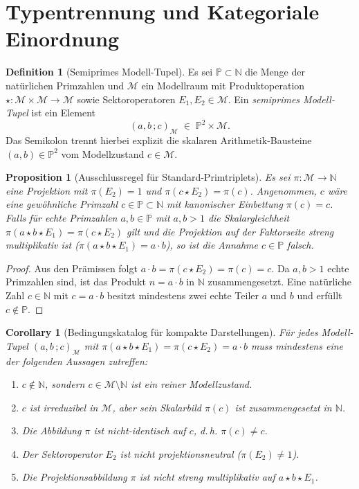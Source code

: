 \documentclass[11pt,a4paper,reqno]{amsart}
\newtheorem{proposition}[theorem]{Proposition}
\newtheorem{corollary}[theorem]{Corollary}
\theoremstyle{definition}
\newtheorem{definition}[theorem]{Definition}
\theoremstyle{remark}
\newcommand{\M}{\mathcal{M}}
\newcommand{\N}{\mathbb{N}}
\newcommand{\Pset}{\mathbb{P}}
\begin{document}
\section{Typentrennung und Kategoriale Einordnung}

\begin{definition}[Semiprimes Modell-Tupel]
Es sei $\Pset \subset \N$ die Menge der natürlichen Primzahlen und $\M$ ein Modellraum mit Produktoperation $\star: \M \times \M \to \M$ sowie Sektoroperatoren $E_1, E_2 \in \M$.
Ein \emph{semiprimes Modell-Tupel} ist ein Element
\begin{equation}
(a,b \,; c)_\M \;\in\; \Pset^2 \times \M.
\end{equation}
Das Semikolon trennt hierbei explizit die skalaren Arithmetik-Bausteine $(a,b) \in \Pset^2$ vom Modellzustand $c \in \M$.
\end{definition}

\begin{proposition}[Ausschlussregel für Standard-Primtriplets]
Es sei $\pi: \M \to \N$ eine Projektion mit $\pi(E_2) = 1$ und $\pi(c \star E_2) = \pi(c)$. Angenommen, $c$ wäre eine gewöhnliche Primzahl $c \in \Pset \subset \N$ mit kanonischer Einbettung $\pi(c) = c$.
Falls für echte Primzahlen $a,b \in \Pset$ mit $a,b > 1$ die Skalargleichheit $\pi(a \star b \star E_1) = \pi(c \star E_2)$ gilt und die Projektion auf der Faktorseite streng multiplikativ ist ($\pi(a \star b \star E_1) = a \cdot b$), so ist die Annahme $c \in \Pset$ falsch.
\end{proposition}

\begin{proof}
Aus den Prämissen folgt $a \cdot b = \pi(c \star E_2) = \pi(c) = c$. Da $a,b > 1$ echte Primzahlen sind, ist das Produkt $n = a \cdot b$ in $\N$ zusammengesetzt. Eine natürliche Zahl $c \in \N$ mit $c = a \cdot b$ besitzt mindestens zwei echte Teiler $a$ und $b$ und erfüllt $c \notin \Pset$.
\end{proof}

\begin{corollary}[Bedingungskatalog für kompakte Darstellungen]
\label{cor:ausschluss}
Für jedes Modell-Tupel $(a,b \,; c)_\M$ mit $\pi(a \star b \star E_1) = \pi(c \star E_2) = a \cdot b$ muss mindestens eine der folgenden Aussagen zutreffen:
\begin{enumerate}
    \item $c \notin \N$, sondern $c \in \M \setminus \N$ ist ein reiner Modellzustand.
    \item $c$ ist irreduzibel in $\M$, aber sein Skalarbild $\pi(c)$ ist zusammengesetzt in $\N$.
    \item Die Abbildung $\pi$ ist nicht-identisch auf $c$, d.\,h. $\pi(c) \neq c$.
    \item Der Sektoroperator $E_2$ ist nicht projektionsneutral ($\pi(E_2) \neq 1$).
    \item Die Projektionsabbildung $\pi$ ist nicht streng multiplikativ auf $a \star b \star E_1$.
\end{enumerate}
\end{corollary}
\end{document}
